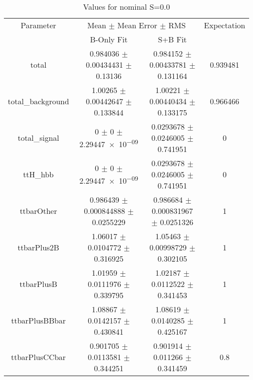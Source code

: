 \begin{table}
\centering
\caption{Values for nominal S=0.0}
\begin{tabular}{cccc}
\toprule
Parameter & \multicolumn{2}{c}{Mean $\pm$ Mean Error $\pm$ RMS} & Expectation\\
 & B-Only Fit & S+B Fit & \\
\midrule
total & \num{0.984036} $\pm$ \num{0.00434431} $\pm$ \num{0.13136} & \num{0.984152} $\pm$ \num{0.00433781} $\pm$ \num{0.131164} & \num{0.939481}\\
total\_background & \num{1.00265} $\pm$ \num{0.00442647} $\pm$ \num{0.133844} & \num{1.00221} $\pm$ \num{0.00440434} $\pm$ \num{0.133175} & \num{0.966466}\\
total\_signal & \num{0} $\pm$ \num{0} $\pm$ \num{2.29447e-09} & \num{0.0293678} $\pm$ \num{0.0246005} $\pm$ \num{0.741951} & \num{0}\\
ttH\_hbb & \num{0} $\pm$ \num{0} $\pm$ \num{2.29447e-09} & \num{0.0293678} $\pm$ \num{0.0246005} $\pm$ \num{0.741951} & \num{0}\\
ttbarOther & \num{0.986439} $\pm$ \num{0.000844888} $\pm$ \num{0.0255229} & \num{0.986684} $\pm$ \num{0.000831967} $\pm$ \num{0.0251326} & \num{1}\\
ttbarPlus2B & \num{1.06017} $\pm$ \num{0.0104772} $\pm$ \num{0.316925} & \num{1.05463} $\pm$ \num{0.00998729} $\pm$ \num{0.302105} & \num{1}\\
ttbarPlusB & \num{1.01959} $\pm$ \num{0.0111976} $\pm$ \num{0.339795} & \num{1.02187} $\pm$ \num{0.0112522} $\pm$ \num{0.341453} & \num{1}\\
ttbarPlusBBbar & \num{1.08867} $\pm$ \num{0.0142157} $\pm$ \num{0.430841} & \num{1.08619} $\pm$ \num{0.0140285} $\pm$ \num{0.425167} & \num{1}\\
ttbarPlusCCbar & \num{0.901705} $\pm$ \num{0.0113581} $\pm$ \num{0.344251} & \num{0.901914} $\pm$ \num{0.011266} $\pm$ \num{0.341459} & \num{0.8}\\
\bottomrule
\end{tabular}
\end{table}
